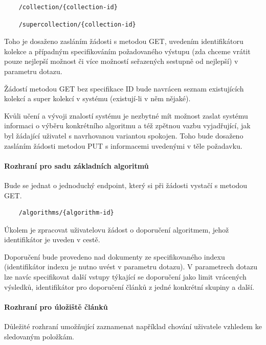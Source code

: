 \documentclass[thesis=M,czech]{FITthesis}[2014/05/07]
\begin{document}
\begin{verbatim}
	/collection/{collection-id}
\end{verbatim}

\begin{verbatim}
	/supercollection/{collection-id}
\end{verbatim}

Toho je dosaženo zasláním žádosti s metodou GET, uvedením identifikátoru kolekce a případným specifikováním požadovaného výstupu (zda chceme vrátit pouze nejlepší možnost či více možností seřazených sestupně od nejlepší) v parametru dotazu.

Žádostí metodou GET bez specifikace ID bude navrácen seznam existujících kolekcí a super kolekcí v systému (existují-li v něm nějaké).

Kvůli učení a vývoji znalostí systému je nezbytné mít možnost zaslat systému informaci o výběru konkrétního algoritmu a též zpětnou vazbu vyjadřující, jak byl žádající uživatel s navrhovanou variantou spokojen. Toho bude dosaženo zasláním žádosti metodou PUT s informacemi uvedenými v těle požadavku.

\paragraph{Rozhraní pro sadu základních algoritmů}

Bude se jednat o jednoduchý endpoint, který si při žádosti vystačí s metodou GET.

\begin{verbatim}
	/algorithms/{algorithm-id}
\end{verbatim}

Úkolem je zpracovat uživatelovu žádost o doporučení algoritmem, jehož identifikátor je uveden v cestě. 

Doporučení bude provedeno nad dokumenty ze specifikovaného indexu (identifikátor indexu je nutno uvést v parametru dotazu). V parametrech dotazu lze navíc specifikovat další vstupy týkající se doporučení jako limit vrácených výsledků, identifikátor pro doporučení článků z jedné konkrétní skupiny a další.

\paragraph{Rozhraní pro úložiště článků}

Důležité rozhraní umožňující zaznamenat například chování uživatele vzhledem ke sledovaným položkám.
\end{document}
